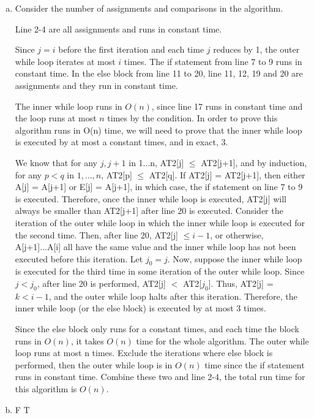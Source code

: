 \documentclass[10pt]{article}
\begin{document}
\begin{enumerate}[a.]
	\item %
		Consider the number of assignments and comparisons in the algorithm.

		Line 2-4 are all assignments and runs in constant time.

		Since $j = i$ before the first iteration and each time $j$ reduces by 1, the outer
		while loop iterates at most $i$ times. 
		The if statement from line 7 to 9 runs in constant time.
		In the else block from line 11 to 20, line 11, 12, 19 and 20 are
		assignments and they run in constant time. 

		The inner while loop runs in $O(n)$, since line 17 runs in constant
		time and the loop runs at most $n$ times by the condition.
		In order to prove this algorithm runs in O(n) time, we will need to
		prove that the inner while loop is executed by at most a constant
		times, and in exact, 3.

		We know that for any $j, j+1$ in 1...n, AT2[j] $\leq$ AT2[j+1], and by
		induction, for any $p < q$ in $1,\ldots, n$, AT2[p] $\leq$ AT2[q].
		If AT2[j] = AT2[j+1], then either A[j] = A[j+1] or E[j] = A[j+1], in
		which case, the if statement on line 7 to 9 is executed. 
		Therefore, once the inner while loop is executed, AT2[j] will always be
		smaller than AT2[j+1] after line 20 is executed.
		Consider the iteration of the outer while loop in which the inner while
		loop is executed for the second time. 
		Then, after line 20, AT2[j] $\leq i-1$, or otherwise, A[j+1]...A[i] all have
		the same value and the inner while loop has not been executed before
		this iteration.
		Let $j_0 = j$.
		Now, suppose the inner while loop is executed for the third time in some
		iteration of the outer while loop.
		Since $j < j_0$, after line 20 is performed, AT2[j] $<$ AT2[$j_0$].
		Thus, AT2[j] = $k < i-1$, and the outer while loop halts after this
		iteration.
		Therefore, the inner while loop (or the else block) is executed by at most 3 times. 
		
		Since the else block only runs for a constant times, and each time the
		block runs in $O(n)$, it takes $O(n)$ time for the whole algorithm. 
		The outer while loop runs at most n times. 
		Exclude the iterations where else block is performed, then the outer while
		loop is in $O(n)$ time since the if statement runs in constant time.
		Combine these two and line 2-4, the total run time for this algorithm
		is $O(n)$. 

	\item %
		\begin{algorithmic}[1]
					\State \Return F
				\Else
					\State \Return T
				\EndIf
			\EndFunction
		\end{algorithmic}


\end{enumerate}
\end{document}
